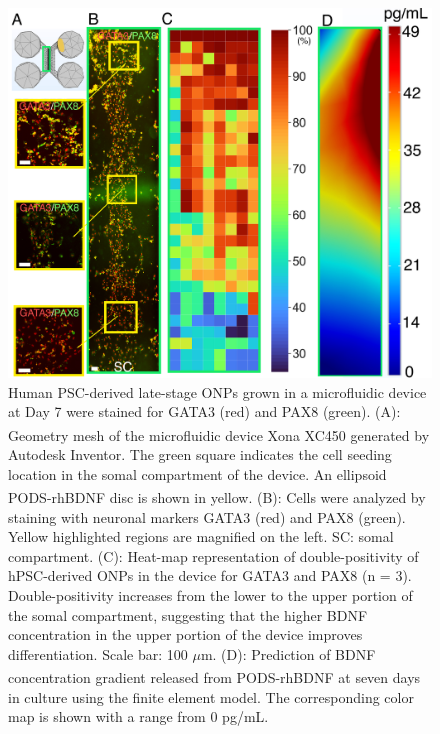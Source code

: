 \documentclass[review]{elsarticle}
\begin{document}
\begin{figure}
	\begin{center}
		\includegraphics[width=13cm]{Fig_7.jpg}
	\end{center}
	\caption{Human PSC-derived late-stage ONPs grown in a microfluidic device at Day 7 were stained for GATA3 (red) and PAX8 (green). (A): Geometry mesh of the microfluidic device Xona\textsuperscript{\texttrademark} XC450 generated by Autodesk Inventor. The green square indicates the cell seeding location in the somal compartment of the device. An ellipsoid PODS\textsuperscript{\textregistered}-rhBDNF disc is shown in yellow. (B): Cells were analyzed by staining with neuronal markers GATA3 (red) and PAX8 (green). Yellow highlighted regions are magnified on the left. SC: somal compartment. (C): Heat-map representation of double-positivity of hPSC-derived ONPs in the device for GATA3 and PAX8 (n = 3). Double-positivity increases from the lower to the upper portion of the somal compartment, suggesting that the higher BDNF concentration in the upper portion of the device improves differentiation. Scale bar: 100 $\mu$m. (D): Prediction of BDNF concentration gradient released from PODS\textsuperscript{\textregistered}-rhBDNF at seven days in culture using the finite element model.  The corresponding color map is shown with a range from 0 pg/mL.
	}
\end{figure}
\end{document}
